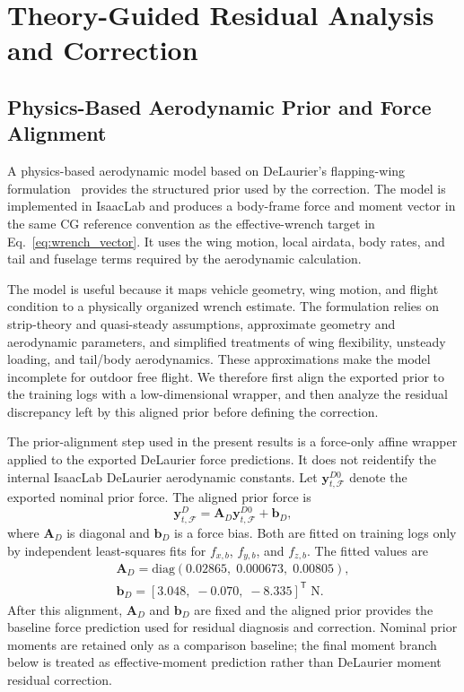 \section{Theory-Guided Residual Analysis and Correction}
\label{sec:method}

\subsection{Physics-Based Aerodynamic Prior and Force Alignment}
\label{subsec:delaurier_calibration}

A physics-based aerodynamic model based on DeLaurier's flapping-wing formulation~\cite{delaurier1993} provides the structured prior used by the correction. The model is implemented in IsaacLab and produces a body-frame force and moment vector in the same CG reference convention as the effective-wrench target in Eq.~\eqref{eq:wrench_vector}. It uses the wing motion, local airdata, body rates, and tail and fuselage terms required by the aerodynamic calculation.

The model is useful because it maps vehicle geometry, wing motion, and flight condition to a physically organized wrench estimate. The formulation relies on strip-theory and quasi-steady assumptions, approximate geometry and aerodynamic parameters, and simplified treatments of wing flexibility, unsteady loading, and tail/body aerodynamics. These approximations make the model incomplete for outdoor free flight. We therefore first align the exported prior to the training logs with a low-dimensional wrapper, and then analyze the residual discrepancy left by this aligned prior before defining the correction.

The prior-alignment step used in the present results is a force-only affine wrapper applied to the exported DeLaurier force predictions. It does not reidentify the internal IsaacLab DeLaurier aerodynamic constants. Let $\mathbf{y}^{D0}_{t,\mathcal{F}}$ denote the exported nominal prior force. The aligned prior force is
\begin{equation}
  \mathbf{y}^{D}_{t,\mathcal{F}}
  =
  \mathbf{A}_{D}\mathbf{y}^{D0}_{t,\mathcal{F}}
  +
  \mathbf{b}_{D},
\label{eq:prior_params}
\end{equation}
where $\mathbf{A}_{D}$ is diagonal and $\mathbf{b}_{D}$ is a force bias. Both are fitted on training logs only by independent least-squares fits for $f_{x,b}$, $f_{y,b}$, and $f_{z,b}$. The fitted values are
\begin{equation}
\begin{aligned}
  \mathbf{A}_{D}
  =
  \mathrm{diag}(0.02865,\;0.000673,\;0.00805),\\
  \mathbf{b}_{D}
  =
  [3.048,\;-0.070,\;-8.335]^{\mathsf{T}}\;\mathrm{N}.
\end{aligned}
  \label{eq:prior_affine_values}
\end{equation}
After this alignment, $\mathbf{A}_{D}$ and $\mathbf{b}_{D}$ are fixed and the aligned prior provides the baseline force prediction used for residual diagnosis and correction. Nominal prior moments are retained only as a comparison baseline; the final moment branch below is treated as effective-moment prediction rather than DeLaurier moment residual correction.

